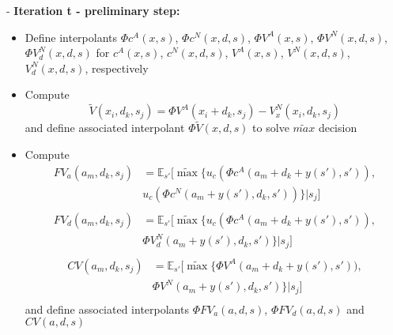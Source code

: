 \documentclass{beamer}
\begin{document}
\begin{frame}
  \footnotesize
  - \textbf{Iteration t - preliminary step:}
  \begin{itemize}
  \item Define interpolants $\Phi c^A(x, s)$, $\Phi c^N(x, d, s)$, $\Phi V^A(x, s)$, $\Phi V^N(x, d, s)$, $\Phi V_d^N(x, d, s)$ for $c^A(x, s)$, $c^N(x, d, s)$, $V^A(x, s)$, $V^N(x, d, s)$, $V_d^N(x, d, s)$, respectively
  \item Compute
  \begin{equation*}
    \tilde{V}(x_i, d_k, s_j) = \Phi V^A(x_i+d_k, s_j)-V^N_x(x_i, d_k, s_j)
  \end{equation*}
  and define associated interpolant $\Phi \tilde{V}(x, d, s)$  to solve $\tilde{max}$ decision
  \item Compute
  \begin{equation*}
    \begin{split}
    FV_a(a_m,d_k,s_j) &= \mathbb{E}_{s'} [\tilde{\max}\{u_c(\Phi c^A(a_m+d_k+y(s'), s')),\\
    & u_c(\Phi c^N(a_m+y(s'), d_k, s'))\}|s_j]\\
    \end{split}
  \end{equation*}
  \begin{equation*}
    \begin{split}
    FV_d(a_m,d_k,s_j) &= \mathbb{E}_{s'} [\tilde{\max}\{u_c(\Phi c^A(a_m+d_k+y(s'), s')),\\
    & \Phi V^N_d(a_m+y(s'), d_k, s')\}|s_j]\\
    \end{split}
  \end{equation*}
  \begin{equation*}
    \begin{split}
    CV(a_m,d_k,s_j) &= \mathbb{E}_{s'} [\tilde{\max}\{\Phi V^A(a_m+d_k+y(s'), s')),\\
    & \Phi V^N(a_m+y(s'), d_k, s')\}|s_j]\\
    \end{split}
  \end{equation*}
  and define associated interpolants $\Phi FV_a(a,d,s)$, $\Phi FV_d(a,d,s)$ and $CV(a,d,s)$
  \end{itemize}
\end{frame}
\end{document}
